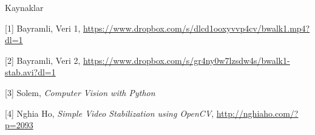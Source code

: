 \documentclass[12pt,fleqn]{article}\usepackage{../../common}
\begin{document}
Kaynaklar

[1] Bayramli, Veri 1, \url{https://www.dropbox.com/s/dlcd1ooxyvvp4cv/bwalk1.mp4?dl=1}

[2] Bayramli, Veri 2, \url{https://www.dropbox.com/s/gr4ny0w7lzsdw4s/bwalk1-stab.avi?dl=1}

[3] Solem, {\em Computer Vision with Python}

[4] Nghia Ho, {\em Simple Video Stabilization using OpenCV},
    \url{http://nghiaho.com/?p=2093}
\end{document}
